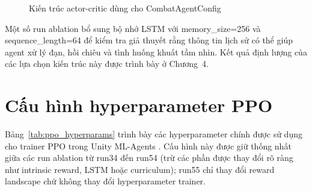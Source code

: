\begin{figure}[H]
    \centering
    \caption{Kiến trúc actor-critic dùng cho CombatAgentConfig}
    \label{fig:actor_critic_architecture}
\end{figure}

Một số run ablation bổ sung bộ nhớ LSTM với memory\_size=256 và sequence\_length=64 để kiểm tra giả thuyết rằng thông tin lịch sử có thể giúp agent xử lý đạn, hồi chiêu và tình huống khuất tầm nhìn. Kết quả định lượng của các lựa chọn kiến trúc này được trình bày ở Chương~4.

\section{Cấu hình hyperparameter PPO}

Bảng~\ref{tab:ppo_hyperparams} trình bày các hyperparameter chính được sử dụng cho trainer PPO trong Unity ML-Agents \cite{Juliani2018}. Cấu hình này được giữ thống nhất giữa các run ablation từ run34 đến run54 (trừ các phần được thay đổi rõ ràng như intrinsic reward, LSTM hoặc curriculum); run55 chỉ thay đổi reward landscape chứ không thay đổi hyperparameter trainer.


